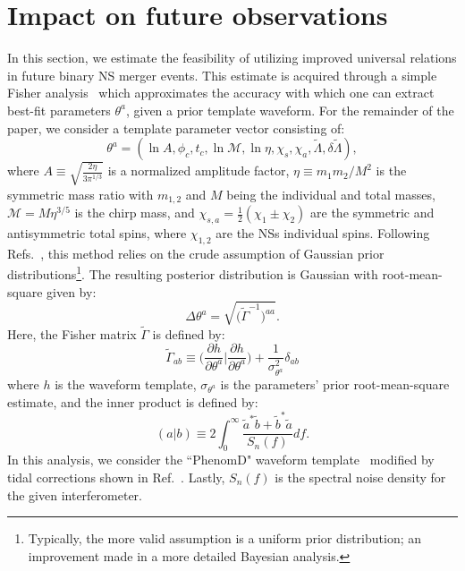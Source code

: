 \documentclass[prd,twocolumn,nofootinbib,superscriptaddress,amsmath,amssymb]{revtex4-1}
\begin{document}
\section{Impact on future observations}\label{sec:observations}
In this section, we estimate the feasibility of utilizing improved universal relations in future binary NS merger events.
This estimate is acquired through a simple Fisher analysis~\cite{Finn:Fisher,Cutler:Fisher} which approximates the accuracy with which one can extract best-fit parameters $\theta^a$, given a prior template waveform.
For the remainder of the paper, we consider a template parameter vector consisting of:
\begin{equation}\label{eq:template}
\theta^a=(\ln{A},\phi_c,t_c,\ln{\mathcal{M}},\ln{\mathcal{\eta}},\chi_s,\chi_a,\tilde{\Lambda},\delta \tilde{\Lambda}),
\end{equation}
where $A \equiv \sqrt{\frac{2 \eta}{3 \pi^{1/3}}}$ is a normalized amplitude factor, $\eta \equiv m_1 m_2/M^2$ is the symmetric mass ratio with $m_{1,2}$ and $M$ being the individual and total masses, $\mathcal{M}=M \eta^{3/5}$ is the chirp mass, and $\chi_{s,a}=\frac{1}{2}(\chi_1\pm\chi_2)$ are the symmetric and antisymmetric total spins, where $\chi_{1,2}$ are the NSs individual spins. 
Following Refs.~\cite{Cutler:Fisher,Berti:Fisher,Poisson:Fisher}, this method relies on the crude assumption of Gaussian prior distributions\footnote{Typically, the more valid assumption is a uniform prior distribution; an improvement made in a more detailed Bayesian analysis.}.
The resulting posterior distribution is Gaussian with root-mean-square given by:
\begin{equation}
\Delta \theta^a=\sqrt{\Big( \tilde{\Gamma}^{-1}\Big)^{aa}}.
\end{equation}
Here, the Fisher matrix $\tilde{\Gamma}$ is defined by:
\begin{equation}
\tilde{\Gamma}_{ab} \equiv \Big( \frac{\partial h}{\partial \theta^a} \Big| \frac{\partial h}{\partial \theta^a}\Big) + \frac{1}{\sigma_{\theta^a}^2} \delta_{ab}
\end{equation}
where $h$ is the waveform template, $\sigma_{\theta^a}$ is the parameters' prior root-mean-square estimate, and the inner product is defined by:
\begin{equation}
(a|b) \equiv 2 \int^{\infty}_0\frac{\tilde{a}^*\tilde{b}+\tilde{b}^*\tilde{a}}{S_n(f)}df.
\end{equation}
In this analysis, we consider the ``PhenomD" waveform template~\cite{PhenomDI,PhenomDII} modified by tidal corrections shown in Ref.~\cite{Wade:tidalCorrections}.
Lastly, $S_n(f)$ is the spectral noise density for the given interferometer.
\end{document}
